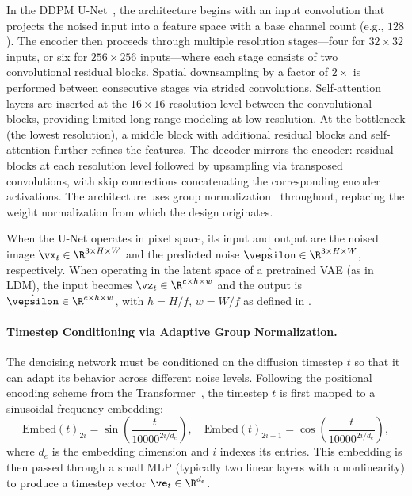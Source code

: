\documentclass[../../book-main.tex]{subfiles}
\begin{document}
In the DDPM U-Net~\citep{ho2020denoising}, the architecture begins with an input convolution that projects the noised input into a feature space with a base channel count (e.g., \(128\)).
The encoder then proceeds through multiple resolution stages---four for \(32 \times 32\) inputs, or six for \(256 \times 256\) inputs---where each stage consists of two convolutional residual blocks.
Spatial downsampling by a factor of \(2\times\) is performed between consecutive stages via strided convolutions.
Self-attention layers are inserted at the \(16 \times 16\) resolution level between the convolutional blocks, providing limited long-range modeling at low resolution.
At the bottleneck (the lowest resolution), a middle block with additional residual blocks and self-attention further refines the features.
The decoder mirrors the encoder: residual blocks at each resolution level followed by upsampling via transposed convolutions, with skip connections concatenating the corresponding encoder activations.
The architecture uses group normalization~\citep{wu2018group} throughout, replacing the weight normalization from which the design originates.

When the U-Net operates in pixel space, its input and output are the noised image \(\vx_t \in \R^{3 \times H \times W}\) and the predicted noise \(\hat{\vepsilon} \in \R^{3 \times H \times W}\), respectively.
When operating in the latent space of a pretrained VAE (as in LDM), the input becomes \(\vz_t \in \R^{c \times h \times w}\) and the output is \(\hat{\vepsilon} \in \R^{c \times h \times w}\), with \(h = H/f\), \(w = W/f\) as defined in .

\paragraph{Timestep Conditioning via Adaptive Group Normalization.}
The denoising network must be conditioned on the diffusion timestep \(t\) so that it can adapt its behavior across different noise levels.
Following the positional encoding scheme from the Transformer~\citep{vaswani2017attention}, the timestep \(t\) is first mapped to a sinusoidal frequency embedding:
\begin{equation}
    \mathrm{Embed}(t)_{2i} = \sin\left(\frac{t}{10000^{2i/d_e}}\right), \quad
    \mathrm{Embed}(t)_{2i+1} = \cos\left(\frac{t}{10000^{2i/d_e}}\right) ,
\end{equation}
where \(d_e\) is the embedding dimension and \(i\) indexes its entries.
This embedding is then passed through a small MLP (typically two linear layers with a nonlinearity) to produce a timestep vector \(\ve_t \in \R^{d_e}\).
\end{document}
